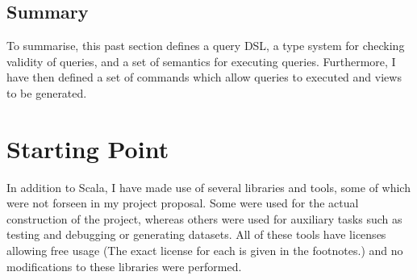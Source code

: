 \documentclass[12pt,a4paper,twoside,openright]{report}
\begin{document}
\subsection{Summary}
To summarise, this past section defines a query DSL, a type system for checking validity of queries, and a set of semantics for executing queries. Furthermore, I have then defined a set of commands which allow queries to executed and views to be generated.


\section{Starting Point}
In addition to Scala, I have made use of several libraries and tools, some of which were not forseen in my project proposal. Some were used for the actual construction of the project, whereas others were used for auxiliary tasks such as testing and debugging or  generating datasets. All of these tools have licenses allowing free usage (The exact license for each is given in the footnotes.) and no modifications to these libraries were performed.\\
\end{document}
